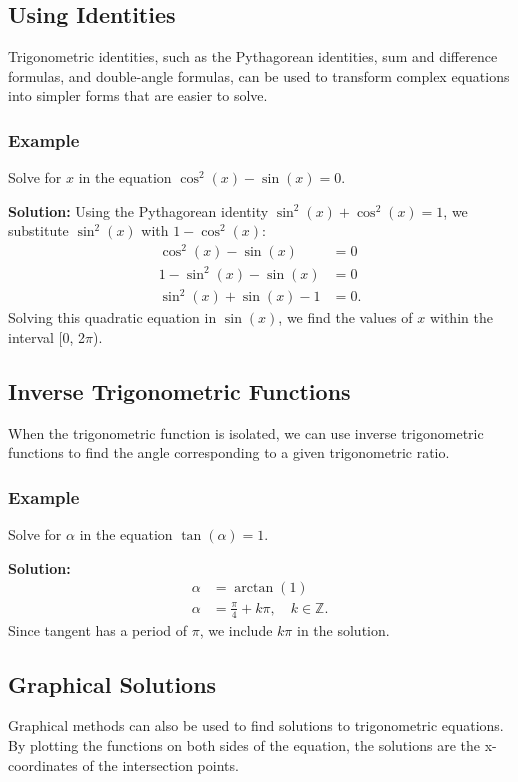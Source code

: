 \documentclass[a4paper,12pt]{book}
\begin{document}
\subsection{Using Identities}
\label{subsec:using_identities}
Trigonometric identities, such as the Pythagorean identities, sum and difference formulas, and double-angle formulas, can be used to transform complex equations into simpler forms that are easier to solve.

\subsubsection{Example}
Solve for \(x\) in the equation \(\cos^2(x) - \sin(x) = 0\).

\textbf{Solution:}
Using the Pythagorean identity \(\sin^2(x) + \cos^2(x) = 1\), we substitute \(\sin^2(x)\) with \(1 - \cos^2(x)\):
\begin{align*}
\cos^2(x) - \sin(x) &= 0 \\
1 - \sin^2(x) - \sin(x) &= 0 \\
\sin^2(x) + \sin(x) - 1 &= 0.
\end{align*}
Solving this quadratic equation in \(\sin(x)\), we find the values of \(x\) within the interval [0, 2\(\pi\)).

\subsection{Inverse Trigonometric Functions}
\label{subsec:inverse_trig_functions}
When the trigonometric function is isolated, we can use inverse trigonometric functions to find the angle corresponding to a given trigonometric ratio.

\subsubsection{Example}
Solve for \(\alpha\) in the equation \(\tan(\alpha) = 1\).

\textbf{Solution:}
\begin{align*}
\alpha &= \arctan(1) \\
\alpha &= \frac{\pi}{4} + k\pi, \quad k \in \mathbb{Z}.
\end{align*}
Since tangent has a period of \(\pi\), we include \(k\pi\) in the solution.

\subsection{Graphical Solutions}
\label{subsec:graphical_solutions}
Graphical methods can also be used to find solutions to trigonometric equations. By plotting the functions on both sides of the equation, the solutions are the x-coordinates of the intersection points.
\end{document}
